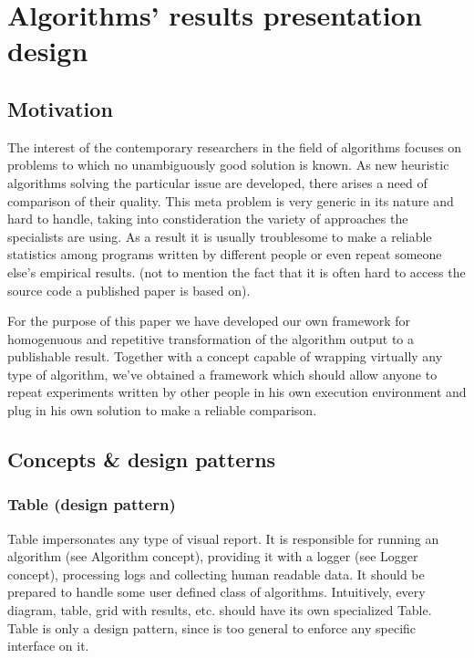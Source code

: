 \chapter{Algorithms' results presentation design}
\section{Motivation}

The interest of the contemporary researchers in the field of algorithms 
focuses on problems to which no unambiguously good solution is known. As new heuristic algorithms solving the
particular issue are developed, there arises a need of comparison of their
quality. This meta problem is very generic in its nature and hard to handle,
taking into constideration the variety of approaches the specialists are using.
As a result it is usually troublesome to make a reliable statistics among programs
written by different people or even repeat someone else's empirical results. (not to mention
the fact that it is often hard to access the source code a published paper is
based on).

For the purpose of this paper we have developed our own framework
for homogenuous and repetitive transformation of the algorithm output to a
publishable result. Together with a concept capable of wrapping virtually any
type of algorithm, we've obtained a framework which should allow anyone to
repeat experiments written by other people in his own execution environment
and plug in his own solution to make a reliable comparison.

\section{Concepts \& design patterns}

\subsection{Table (design pattern)}

Table impersonates any type of visual report.
It is responsible for running an algorithm (see Algorithm concept), providing
it with a logger (see Logger concept), processing logs and collecting human
readable data. It should be prepared to handle some user defined class of
algorithms. Intuitively, every diagram, table, grid with results, etc. should
have its own specialized Table. Table is only a design pattern, since is too
general to enforce any specific interface on it.

